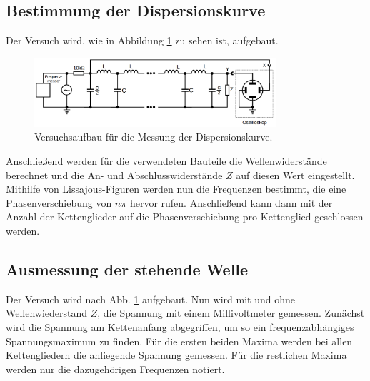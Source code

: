 \subsection{Bestimmung der Dispersionskurve}
Der Versuch wird, wie in Abbildung \ref{fig:aufbau_dispersion} zu sehen ist, aufgebaut.%
\begin{figure}
  \centering
  \includegraphics[width=0.8\textwidth]{bilder/versuchsaufbau_dispersion.png}
  \caption{Versuchsaufbau für die Messung der Dispersionskurve.\cite{anleitung356}}
  \label{fig:aufbau_dispersion}
\end{figure}
Anschließend werden für die verwendeten Bauteile
die Wellenwiderstände berechnet %
und die An- und Abschlusswiderstände $Z$ auf diesen Wert eingestellt.
Mithilfe von Lissajous-Figuren werden nun die Frequenzen bestimmt, die eine Phasenverschiebung von $n\pi$ %
hervor rufen. Anschließend kann dann mit der Anzahl der Kettenglieder auf die %
Phasenverschiebung pro Kettenglied geschlossen werden.

\subsection{Ausmessung der stehende Welle}
Der Versuch wird nach Abb. \ref{fig:aufbau_dispersion} aufgebaut.
Nun wird mit und ohne Wellenwiederstand $Z$, die Spannung mit einem Millivoltmeter gemessen. %
Zunächst wird die Spannung am Kettenanfang abgegriffen, um so ein frequenzabhängiges Spannungsmaximum
zu finden. Für die ersten beiden Maxima werden bei allen Kettengliedern die anliegende Spannung gemessen. %
Für die restlichen Maxima werden nur die dazugehörigen Frequenzen notiert.
